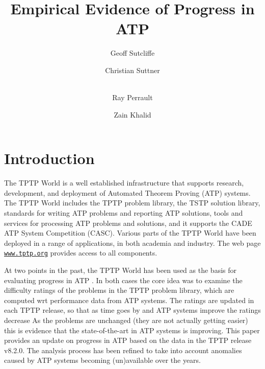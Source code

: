 \documentclass[runningheads]{llncs}
\begin{document}
\title{Empirical Evidence of Progress in ATP}

\author{
Geoff Sutcliffe
\and
Christian Suttner
\and \\
Ray Perrault
\and
Zain Khalid
}

\maketitle
\begin{abstract}

\end{abstract}
\section{Introduction}
\label{Introduction}

The TPTP World \cite{Sut17} is a well established infrastructure that supports research, 
development, and deployment of Automated Theorem Proving (ATP) systems.
The TPTP World includes the TPTP problem library,
the TSTP solution library,
standards for writing ATP problems and reporting ATP solutions,
tools and services for processing ATP problems and solutions,
and it supports the CADE ATP System Competition (CASC).
Various parts of the TPTP World have been deployed in a range of applications,
in both academia and industry.
The web page \href{https://www.tptp.org}{\tt www.tptp.org} provides access to all 
components.

At two points in the past, the TPTP World has been used as the basis for evaluating progress
in ATP \cite{SFS01,SSP21}.
In both cases the core idea was to examine the difficulty ratings of the problems in the TPTP 
problem library, which are computed wrt performance data from ATP systems.
The ratings are updated in each TPTP release, so that as time goes by and ATP systems improve 
the ratings decrease
As the problems are unchanged (they are not actually getting easier) this is evidence that 
the state-of-the-art in ATP systems is improving.
This paper provides an update on progress in ATP based on the data in the TPTP release v8.2.0.
The analysis process has been refined to take into account anomalies caused by ATP systems
becoming (un)available over the years.
\end{document}
